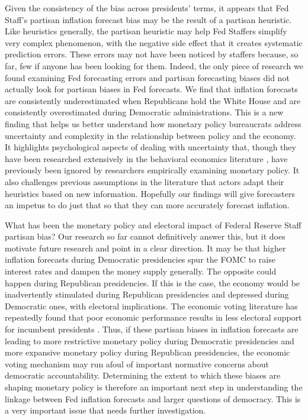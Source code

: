 \documentclass[a4paper]{article}\usepackage{graphicx, color}
\begin{document}
Given the consistency of the bias across presidents' terms, it appears that Fed Staff's partisan inflation forecast bias may be the result of a partisan heuristic. Like heuristics generally, the partisan heuristic may help Fed Staffers simplify very complex phenomenon, with the negative side effect that it creates systematic prediction errors. These errors may not have been noticed by staffers because, so far, few if anyone has been looking for them. Indeed, the only piece of research we found examining Fed forecasting errors and partisan forecasting biases \cite[i.e.][]{Frendreis2000} did not actually look for partisan biases in Fed forecasts. We find that inflation forecasts are consistently underestimated when Republicans hold the White House and are consistently overestimated during Democratic administrations. This is a new finding that helps us better understand how monetary policy bureaucrats address uncertainty and complexity in the relationship between policy and the economy. It highlights psychological aspects of dealing with uncertainty that, though they have been researched extensively in the behavioral economics literature \citep{kahneman1973, tverskykahneman1974, kahneman2003}, have previously been ignored by researchers empirically examining monetary policy. It also challenges previous assumptions in the literature \cite[see in particular][]{Grauwe2011} that actors adapt their heuristics based on new information. Hopefully our findings will give forecasters an impetus to do just that so that they can more accurately forecast inflation.

What has been the monetary policy and electoral impact of Federal Reserve Staff partisan bias? Our research so far cannot definitively answer this, but it does motivate future research and point in a clear direction. It may be that higher inflation forecasts during Democratic presidencies spur the FOMC to raise interest rates and dampen the money supply generally. The opposite could happen during Republican presidencies. If this is the case, the economy would be inadvertently stimulated during Republican presidencies and depressed during Democratic ones, with electoral implications. The economic voting literature has repeatedly found that poor economic performance results in less electoral support for incumbent presidents \citep[e.g.][]{Alvarez1998, Bloom1975, LewisBeck1988, Powell1993}. Thus, if these partisan biases in inflation forecasts are leading to more restrictive monetary policy during Democratic presidencies and more expansive monetary policy during Republican presidencies, the economic voting mechanism may run afoul of important normative concerns about democratic accountability. Determining the extent to which these biases are shaping monetary policy is therefore an important next step in understanding the linkage between Fed inflation forecasts and larger questions of democracy. This is a very important issue that needs further investigation.
\end{document}
